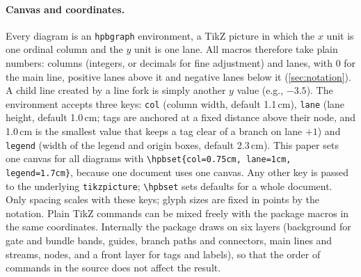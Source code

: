 \paragraph{Canvas and coordinates.}
Every diagram is an \texttt{hpbgraph} environment, a TikZ picture in which
the $x$ unit is one ordinal column and the $y$ unit is one lane. All
macros therefore take plain numbers: columns (integers, or decimals for
fine adjustment) and lanes, with $0$ for the main line, positive lanes
above it and negative lanes below it (\cref{sec:notation}). A child line
created by a line fork is simply another $y$ value (e.g., $-3.5$). The
environment accepts three keys: \texttt{col} (column width, default
1.1\,cm), \texttt{lane} (lane height, default 1.0\,cm; tags are anchored at
a fixed distance above their node, and 1.0\,cm is the smallest value that
keeps a tag clear of a branch on lane $+1$) and \texttt{legend} (width of
the legend and origin boxes, default 2.3\,cm). This paper sets one canvas
for all diagrams with \texttt{\textbackslash hpbset\{col=0.75cm, lane=1cm,
legend=1.7cm\}}, because one document uses one canvas. Any other key is passed to the
underlying \texttt{tikzpicture}; \texttt{\textbackslash hpbset} sets
defaults for a whole document. Only spacing scales with these keys; glyph
sizes are fixed in points by the notation. Plain TikZ commands can be mixed
freely with the package macros in the same coordinates. Internally the
package draws on six layers (background for gate and bundle bands, guides,
branch paths and connectors, main lines and streams, nodes, and a front
layer for tags and labels), so that the order of commands in the source
does not affect the result.

